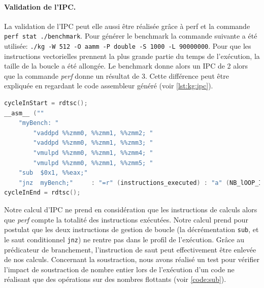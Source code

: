         \begin{table}[h!]
        \centering
        \caption{Vérification du nombre d'instructions exécutées avec l'outil perf.}
        \label{tab:kg_vs_perf}
        \end{table}
        
        
        
        \paragraph{Validation de l'IPC.} La validation de l'IPC peut elle aussi être réalisée grâce à perf et la commande \verb|perf stat ./benchmark|. Pour générer le benchmark la commande suivante a été utilisée: \verb|./kg -W 512 -O aamm -P double -S 1000 -L 90000000|. Pour que les instructions vectorielles prennent la plus grande partie du temps de l'exécution, la taille de la boucle a été allongée. Le benchmark donne alors un IPC de 2 alors que la commande \textit{perf} donne un résultat de 3. Cette différence peut être expliquée en regardant le code assembleur généré (voir \autoref{lst:kg:ipc}). 
        
        \begin{lstlisting}[label=lst:kg:ipc ,language=C, caption=Code généré par la commande ./kg -W 512 -O aamm -P double]
cycleInStart = rdtsc();
__asm__ ("" 
    "myBench: " 
		"vaddpd %%zmm0, %%zmm1, %%zmm2; "
		"vaddpd %%zmm0, %%zmm1, %%zmm3; "
		"vmulpd %%zmm0, %%zmm1, %%zmm4; "
		"vmulpd %%zmm0, %%zmm1, %%zmm5; "
    "sub  $0x1, %%eax;"
    "jnz  myBench;"		: "=r" (instructions_executed) : "a" (NB_lOOP_IN));
cycleInEnd = rdtsc();
\end{lstlisting}
        
        Notre calcul d'IPC ne prend en considération que les instructions de calculs alors que \textit{perf} compte la totalité des instructions exécutées. Notre calcul prend pour postulat que les deux instructions de gestion de boucle (la décrémentation \verb|sub|, et le saut conditionnel \verb|jnz|) ne rentre pas dans le profil de l'exécution. Grâce au prédicateur de branchement, l'instruction de saut peut effectivement être enlevée de nos calculs. Concernant la soustraction, nous avons réalisé un test pour vérifier l'impact de soustraction de nombre entier lors de l'exécution d'un code ne réalisant que des opérations sur des nombres flottants (voir \autoref{code:sub}). 
        
